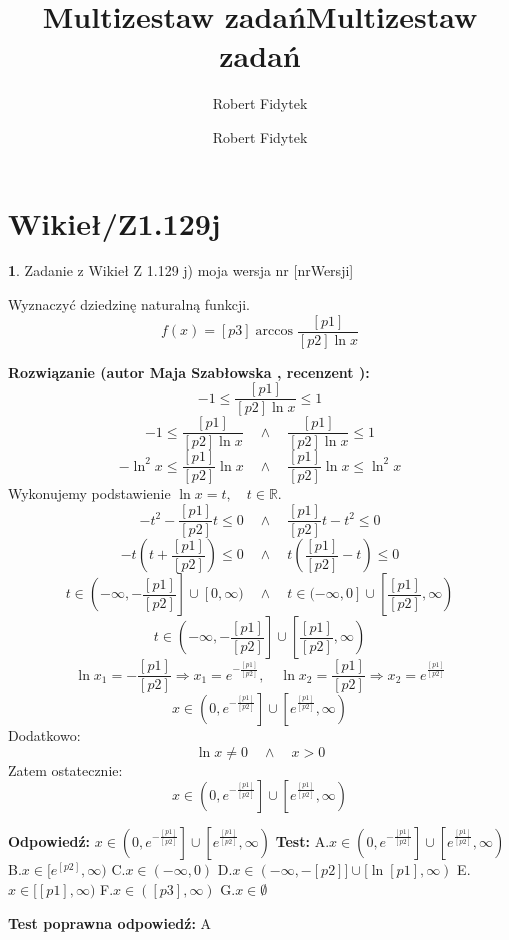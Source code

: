 \documentclass[12pt, a4paper]{article}
\title{Multizestaw zadań}
\author{Robert Fidytek}
\date{}\documentclass[12pt, a4paper]{article}
\title{Multizestaw zadań}
\author{Robert Fidytek}
\date{}
\theoremstyle{definition} %
\newtheorem{zad}{}
\theoremstyle{definition} %
\newtheorem{zad}{}
\newcommand{\kategoria}[1]{\section{#1}} %
\newcommand{\zadStart}[1]{\begin{zad}#1\newline} %
\newcommand{\zadStop}{\end{zad}}   %
\newcommand{\rozwStart}[2]{\noindent \textbf{Rozwiązanie (autor #1 , recenzent #2): }\newline} %
\newcommand{\rozwStop}{\newline}                                            %
\newcommand{\odpStart}{\noindent \textbf{Odpowiedź:}\newline}    %
\newcommand{\odpStop}{\newline}                                             %
\newcommand{\testStart}{\noindent \textbf{Test:}\newline} %
\newcommand{\testStop}{\newline} %
\newcommand{\kluczStart}{\noindent \textbf{Test poprawna odpowiedź:}\newline} %
\newcommand{\kluczStop}{\newline} %
\begin{document}
\maketitle


\kategoria{Wikieł/Z1.129j}
\zadStart{Zadanie z Wikieł Z 1.129 j) moja wersja nr [nrWersji]}

Wyznaczyć dziedzinę naturalną funkcji.
$$f(x)=[p3]\arccos \frac{[p1]}{[p2]\ln x}$$

\zadStop

\rozwStart{Maja Szabłowska}{}
$$-1\leq \frac{[p1]}{[p2]\ln x} \leq 1 $$
$$-1\leq \frac{[p1]}{[p2]\ln x} \quad \land \quad \frac{[p1]}{[p2]\ln x} \leq 1$$
$$-\ln^{2}x\leq \frac{[p1]}{[p2]}\ln x \quad \land \quad \frac{[p1]}{[p2]}\ln x \leq \ln^{2}x$$
Wykonujemy podstawienie $\ln x=t, \quad t\in\mathbb{R}.$
$$-t^{2}-\frac{[p1]}{[p2]}t\leq 0 \quad \land \quad \frac{[p1]}{[p2]}t-t^{2}\leq 0$$
$$-t\left(t+\frac{[p1]}{[p2]}\right)\leq 0 \quad \land \quad t\left(\frac{[p1]}{[p2]}-t \right)\leq 0$$
$$t\in\left(-\infty, -\frac{[p1]}{[p2]}\right]\cup[0,\infty) \quad \land \quad t\in(-\infty,0]\cup\left[\frac{[p1]}{[p2]},\infty\right)$$
$$t\in\left(-\infty,-\frac{[p1]}{[p2]}\right]\cup\left[\frac{[p1]}{[p2]},\infty\right)$$
$$\ln x_{1}=-\frac{[p1]}{[p2]} \Rightarrow x_{1}=e^{-\frac{[p1]}{[p2]}}, \quad \ln x_{2}=\frac{[p1]}{[p2]} \Rightarrow x_{2}=e^{\frac{[p1]}{[p2]}}$$
$$x\in\left(0,e^{-\frac{[p1]}{[p2]}}\right]\cup\left[e^{\frac{[p1]}{[p2]}},\infty\right)$$
Dodatkowo:
$$\ln x \neq 0 \quad \land \quad x>0$$
Zatem ostatecznie:
$$x\in\left(0,e^{-\frac{[p1]}{[p2]}}\right]\cup\left[e^{\frac{[p1]}{[p2]}},\infty\right)$$

\rozwStop
\odpStart
$x\in\left(0,e^{-\frac{[p1]}{[p2]}}\right]\cup\left[e^{\frac{[p1]}{[p2]}},\infty\right)$
\odpStop
\testStart
A.$x\in\left(0,e^{-\frac{[p1]}{[p2]}}\right]\cup\left[e^{\frac{[p1]}{[p2]}},\infty\right)$
B.$x\in[e^{[p2]},\infty)$
C.$x\in(-\infty, 0)$
D.$x\in(-\infty, -[p2]] \cup [\ln[p1],\infty)$
E.$x\in[[p1],\infty)$
F.$x\in([p3],\infty)$
G.$x\in\emptyset$

\testStop
\kluczStart
A
\kluczStop
\end{document}
